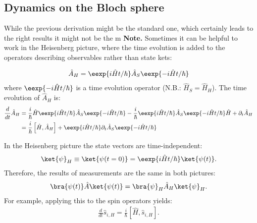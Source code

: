 \subsection{Dynamics on the Bloch sphere}

While the previous derivation might be the standard one, which certainly leads to the right results it might not be the m
\textbf{Note.} Sometimes it can be helpful to work in the Heisenberg picture, where the time evolution is added to the operators describing observables rather than state kets:

\begin{align}
	\hat{A}_H=\eexp{i{\hat{H} t}/{\hbar}} \hat{A}_S \eexp{-i{\hat{H} t}/{\hbar}}
\end{align}
where $\eexp{-i{\hat{H} t}/{\hbar}}$ is a time evolution operator (N.B.: $\hat{H}_S = \hat{H}_H$). The time evolution of $\hat{A}_H$ is:
\begin{align}
 \notag \frac{d}{dt} \hat{A}_H &= \frac{i}{\hbar}\hat{H}\eexp{i{\hat{H}t}/{\hbar}}\hat{A}_S \eexp{-i{\hat{H} t}/{\hbar}}-\frac{i}{\hbar} \eexp{i{\hat{H} t}/{\hbar}}\hat{A}_S \eexp{-i{\hat{H}t}/{\hbar}}\hat{H}+\partial_t\hat{A}_H\\
&= \frac{i}{\hbar}\left[\hat{H},\hat{A}_H\right] + \eexp{i{\hat{H}t}/{\hbar}}\partial_t\hat{A}_S\eexp{-i{\hat{H}t}/{\hbar}}
 \end{align}

In the Heisenberg picture the state vectors are time-in\-de\-pen\-dent:
\begin{align}
	\ket{\psi}_H \equiv \ket{\psi(t=0)}=\eexp{i{\hat{H}}t/{\hbar}} \ket{\psi(t)}.
\end{align}
Therefore, the results of measurements are the same in both pictures:
\begin{align}
\bra{\psi(t)}\hat{A}\ket{\psi(t)} = \bra{\psi}_H \hat{A}_H \ket{\psi}_H.
\end{align}
For example, applying this to the spin operators yields:
\begin{align}						\frac{d}{dt}\hat{s}_{i,H}=\frac{i}{\hbar}\left[\hat{H},\hat{s}_{i,H}\right].
\end{align}